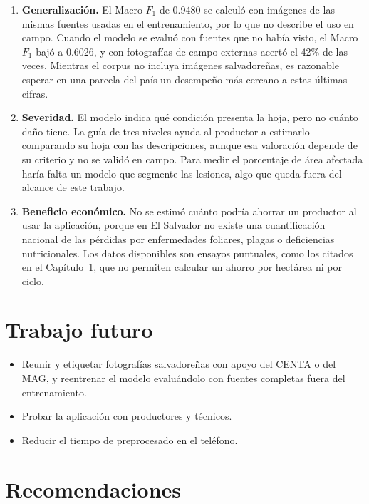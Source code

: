 \begin{enumerate}
\item \textbf{Generalizaci\'on.} El Macro $F_1$ de 0.9480 se calcul\'o con im\'agenes de las mismas fuentes usadas en el entrenamiento, por lo que no describe el uso en campo. Cuando el modelo se evalu\'o con fuentes que no hab\'ia visto, el Macro $F_1$ baj\'o a 0.6026, y con fotograf\'ias de campo externas acert\'o el 42\% de las veces. Mientras el corpus no incluya im\'agenes salvadore\~nas, es razonable esperar en una parcela del pa\'is un desempe\~no m\'as cercano a estas \'ultimas cifras.
\item \textbf{Severidad.} El modelo indica qu\'e condici\'on presenta la hoja, pero no cu\'anto da\~no tiene. La gu\'ia de tres niveles ayuda al productor a estimarlo comparando su hoja con las descripciones, aunque esa valoraci\'on depende de su criterio y no se valid\'o en campo. Para medir el porcentaje de \'area afectada har\'ia falta un modelo que segmente las lesiones, algo que queda fuera del alcance de este trabajo.
\item \textbf{Beneficio econ\'omico.} No se estim\'o cu\'anto podr\'ia ahorrar un productor al usar la aplicaci\'on, porque en El Salvador no existe una cuantificaci\'on nacional de las p\'erdidas por enfermedades foliares, plagas o deficiencias nutricionales. Los datos disponibles son ensayos puntuales, como los citados en el Cap\'itulo~1, que no permiten calcular un ahorro por hect\'area ni por ciclo.
\end{enumerate}

\section*{Trabajo futuro}

\begin{itemize}
\item Reunir y etiquetar fotograf\'ias salvadore\~nas con apoyo del CENTA o del MAG, y reentrenar el modelo evalu\'andolo con fuentes completas fuera del entrenamiento.
\item Probar la aplicaci\'on con productores y t\'ecnicos.
\item Reducir el tiempo de preprocesado en el tel\'efono.
\end{itemize}

\section*{Recomendaciones}


